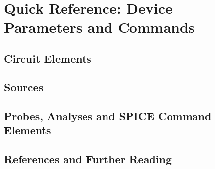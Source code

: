 \chapter{Quick Reference: Device Parameters and Commands}

\label{appendix_quickreferencedeviceparametersandcommands_aqrdpac}

\section{Circuit Elements}
\label{appendix_section_aqrdpac_circuitelements}

\section{Sources}
\label{appendix_section_aqrdpac_sources}

\section{Probes, Analyses and SPICE Command Elements}
\label{appendix_section_probesanalysesandspicecommandelements}

\section{References and Further Reading}
\label{sec_appendix_section_aqrdpac_references}























































